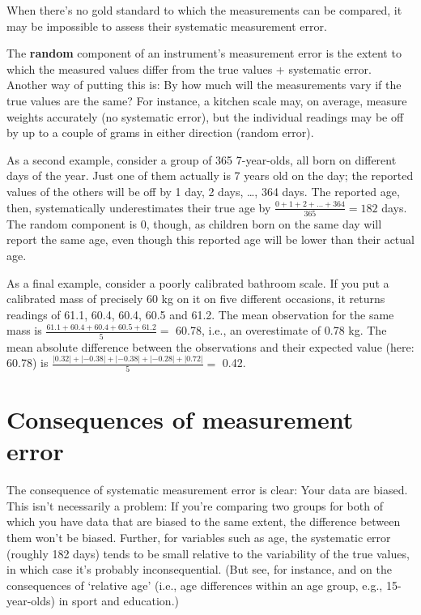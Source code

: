 \documentclass[a4paper]{tufte-book}\usepackage[]{graphicx}\usepackage[]{xcolor}
\newcommand{\term}[1]{\textbf{#1}}
\begin{document}
When there's no gold standard to which the measurements can be compared,
it may be impossible to assess their systematic measurement error.

The \term{random} component of an instrument's measurement error is the
extent to which the measured values differ from the true values + 
systematic error.
Another way of putting this is: By how much will the
measurements vary if the true values are the same?
For instance, a kitchen scale may, on average, measure weights
accurately (no systematic error), 
but the individual readings may be off by up to a couple of grams 
in either direction (random error).

As a second example, consider a group of 365 7-year-olds, all born
on different days of the year. Just one of them actually is 7 years old
on the day; the reported values of the others will be off by 1 day, 2 days, \dots,
364 days. The reported age, then, systematically underestimates their true age
by $\frac{0+1+2+\dots+364}{365} = 182$ days.
The random component is 0, though, as children born on the same day will report
the same age, even though this reported age will be lower than their actual age.

As a final example, consider a poorly calibrated bathroom scale. If you put
a calibrated mass of precisely 60 kg on it on five different occasions, it returns
readings of 61.1, 60.4, 60.4, 60.5 and 61.2.
The mean observation for the same mass is $\frac{61.1+60.4+60.4+60.5+61.2}{5} =$ 60.78,
i.e., an overestimate of 0.78 kg.
The mean absolute difference between the observations and their expected
value (here: 60.78) is $\frac{|0.32| + |-0.38| + |-0.38| + |-0.28| + |0.72|}{5} =$ 0.42.

\section{Consequences of measurement error}
The consequence of systematic measurement error is clear: Your data are biased.
This isn't necessarily a problem: If you're comparing two groups for both
of which you have data that are biased to the same extent, the difference between
them won't be biased. 
Further, for variables such as age, the systematic error (roughly
182 days) tends to be small relative to the variability of the true values, in 
which case it's probably inconsequential.
(But see, for instance, 
\citet{Helsen2005} and \citet{Sprietsma2010} on the consequences of `relative age' (i.e., age 
differences within an age group, e.g., 15-year-olds) in sport and education.)
\end{document}

